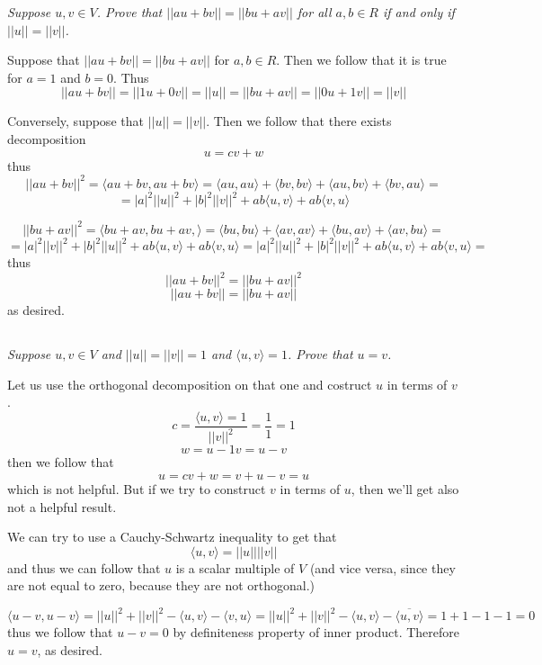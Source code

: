 \documentclass[11pt,oneside,titlepage]{book}
\begin{document}
\textit{Suppose $u, v \in V$. Prove that $||au + bv|| = ||bu + av||$ for all $a, b \in R$
  if and only if $||u|| = ||v||$.}

Suppose that $||au + bv|| = ||bu + av||$ for $a, b \in R$. Then we follow that it is true for
$a = 1$ and $b = 0$. Thus
$$||au + bv|| = ||1u + 0v|| = ||u|| = ||bu + av|| = ||0u + 1v|| = ||v||$$

Conversely, suppose that $||u|| = ||v||$. Then we follow that there exists decomposition
$$u = cv + w$$
thus
$$||au + bv||^2 = \langle au + bv, au + bv \rangle  = \langle au, au \rangle +
\langle bv, bv \rangle + \langle au, bv \rangle + \langle bv, au \rangle = $$
$$ =
|a|^2 ||u||^2 + |b|^2 ||v||^2 + ab \langle u, v \rangle + ab \langle v, u \rangle $$

$$||bu + av||^2 = \langle bu + av,  bu + av, \rangle  = \langle bu, bu \rangle +
\langle av, av \rangle + \langle bu, av \rangle + \langle av, bu \rangle = $$
$$ =
|a|^2 ||v||^2 + |b|^2 ||u||^2 + ab \langle u, v \rangle + ab \langle v, u \rangle =
|a|^2 ||u||^2 + |b|^2 ||v||^2 + ab \langle u, v \rangle + ab \langle v, u \rangle = 
$$
thus
$$||au + bv||^2 = ||bu + av||^2$$
$$||au + bv|| = ||bu + av||$$
as desired.


\subsection{}

\textit{Suppose $u, v \in V$ and $||u|| = ||v|| = 1$ and $\langle u, v \rangle = 1$. Prove that
  $u = v$.}

Let us use the orthogonal decomposition on that one and costruct $u$ in terms of $v$.
$$c = \frac{\langle u, v \rangle = 1}{||v||^2} = \frac{1}{1} = 1$$
$$w = u - 1v = u - v$$
then we follow that
$$u = cv + w = v + u - v = u$$
which is not helpful. But if we try to construct $v$ in terms of $u$, then we'll get also not
a helpful result.

We can try to use a Cauchy-Schwartz inequality to get that
$$\langle u, v \rangle = ||u|| ||v||$$
and thus we can follow that $u$ is a scalar multiple of $V$ (and vice versa, since they are not
equal to zero, because they are not orthogonal.)

$$\langle u - v, u - v \rangle =
||u||^2 + ||v||^2 - \langle u, v \rangle  - \langle v, u \rangle =
||u||^2 + ||v||^2 - \langle u, v \rangle  - \overline{\langle u, v \rangle} =  1 + 1 - 1 - 1 = 0 $$
thus we follow that $u - v = 0$ by definiteness property of inner product.
Therefore $u = v$, as desired.
\end{document}
